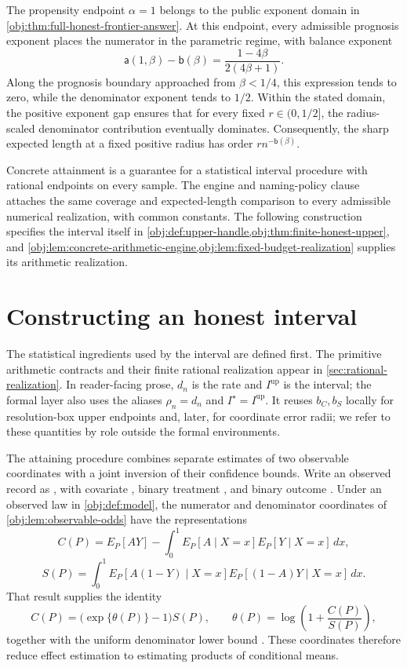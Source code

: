 \documentclass[11pt]{article}
\begin{document}
The propensity endpoint \(\alpha=1\) belongs to the public exponent domain in \cref{obj:thm:full-honest-frontier-answer}. At this endpoint, every admissible prognosis exponent places the numerator in the parametric regime, with balance exponent
\[
\mathsf a(1,\beta)-\mathsf b(\beta)
=
\frac{1-4\beta}{2(4\beta+1)}.
\]
Along the prognosis boundary approached from \(\beta<1/4\), this expression tends to zero, while the denominator exponent tends to \(1/2\). Within the stated domain, the positive exponent gap ensures that for every fixed \(r\in(0,1/2]\), the radius-scaled denominator contribution eventually dominates. Consequently, the sharp expected length at a fixed positive radius has order \(r n^{-\mathsf b(\beta)}\).

Concrete attainment is a guarantee for a statistical interval procedure with rational endpoints on every sample. The engine and naming-policy clause attaches the same coverage and expected-length comparison to every admissible numerical realization, with common constants. The following construction specifies the interval itself in \cref{obj:def:upper-handle,obj:thm:finite-honest-upper}, and \cref{obj:lem:concrete-arithmetic-engine,obj:lem:fixed-budget-realization} supplies its arithmetic realization.


\section{Constructing an honest interval}

The statistical ingredients used by the interval are defined first. The primitive arithmetic contracts and their finite rational realization appear in \cref{sec:rational-realization}. In reader-facing prose, \(d_n\) is the rate and \(I^{\mathrm{up}}\) is the interval; the formal layer also uses the aliases \(\rho_n=d_n\) and \(I^\star=I^{\mathrm{up}}\). It reuses \(b_C,b_S\) locally for resolution-box upper endpoints and, later, for coordinate error radii; we refer to these quantities by role outside the formal environments.

The attaining procedure combines separate estimates of two observable coordinates with a joint inversion of their confidence bounds. Write an observed record as , with covariate , binary treatment , and binary outcome . Under an observed law  in \cref{obj:def:model}, the numerator and denominator coordinates of \cref{obj:lem:observable-odds} have the representations
\[
C(P)
=
E_P[AY]
-
\int_0^1
E_P[A\mid X=x]E_P[Y\mid X=x]\,dx,
\]
\[
S(P)
=
\int_0^1
E_P[A(1-Y)\mid X=x]
E_P[(1-A)Y\mid X=x]\,dx.
\]
That result supplies the identity
\[
C(P)=\bigl(\exp\{\theta(P)\}-1\bigr)S(P),
\qquad
\theta(P)=\log\!\left(1+\frac{C(P)}{S(P)}\right),
\]
together with the uniform denominator lower bound . These coordinates therefore reduce effect estimation to estimating products of conditional means.
\end{document}
